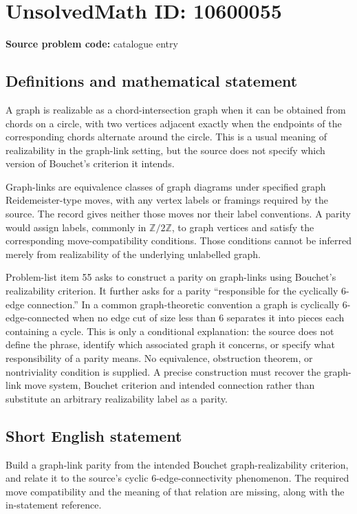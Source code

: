 \documentclass[11pt]{article}
\newcommand{\Z}{\mathbb{Z}}
\begin{document}
\section*{UnsolvedMath ID: 10600055}
\textbf{Source problem code:} catalogue entry
\subsection{Definitions and mathematical statement}
A graph is realizable as a chord-intersection graph when it can be obtained from chords on a circle, with two vertices adjacent exactly when the endpoints of the corresponding chords alternate around the circle. This is a usual meaning of realizability in the graph-link setting, but the source does not specify which version of Bouchet's criterion it intends.

Graph-links are equivalence classes of graph diagrams under specified graph Reidemeister-type moves, with any vertex labels or framings required by the source. The record gives neither those moves nor their label conventions. A parity would assign labels, commonly in \(\Z/2\Z\), to graph vertices and satisfy the corresponding move-compatibility conditions. Those conditions cannot be inferred merely from realizability of the underlying unlabelled graph.

Problem-list item 55 asks to construct a parity on graph-links using Bouchet's realizability criterion. It further asks for a parity ``responsible for the cyclically 6-edge connection.'' In a common graph-theoretic convention a graph is cyclically \(6\)-edge-connected when no edge cut of size less than \(6\) separates it into pieces each containing a cycle. This is only a conditional explanation: the source does not define the phrase, identify which associated graph it concerns, or specify what responsibility of a parity means. No equivalence, obstruction theorem, or nontriviality condition is supplied. A precise construction must recover the graph-link move system, Bouchet criterion and intended connection rather than substitute an arbitrary realizability label as a parity.
\subsection{Short English statement}
Build a graph-link parity from the intended Bouchet graph-realizability criterion, and relate it to the source's cyclic \(6\)-edge-connectivity phenomenon. The required move compatibility and the meaning of that relation are missing, along with the in-statement reference.
\end{document}
